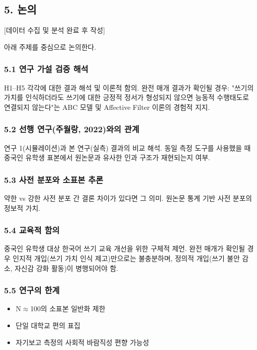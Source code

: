 \documentclass[a4paper,10pt]{oblivoir}
\begin{document}
\subsection{5. 논의}

[데이터 수집 및 분석 완료 후 작성]

아래 주제를 중심으로 논의한다.

\subsubsection{5.1 연구 가설 검증 해석}

H1–H5 각각에 대한 결과 해석 및 이론적 함의. 완전 매개 결과가 확인될 경우: "쓰기의 가치를 인식하더라도 쓰기에 대한 긍정적 정서가 형성되지 않으면 능동적 수행태도로 연결되지 않는다"는 ABC 모델 및 Affective Filter 이론의 경험적 지지.

\subsubsection{5.2 선행 연구(주월랑, 2022)와의 관계}

연구 1(시뮬레이션)과 본 연구(실측) 결과의 비교 해석. 동일 측정 도구를 사용했을 때 중국인 유학생 표본에서 원논문과 유사한 인과 구조가 재현되는지 여부.

\subsubsection{5.3 사전 분포와 소표본 추론}

약한 vs 강한 사전 분포 간 결론 차이가 있다면 그 의미. 원논문 통계 기반 사전 분포의 정보적 가치.

\subsubsection{5.4 교육적 함의}

중국인 유학생 대상 한국어 쓰기 교육 개선을 위한 구체적 제언. 완전 매개가 확인될 경우 인지적 개입(쓰기 가치 인식 제고)만으로는 불충분하며, 정의적 개입(쓰기 불안 감소, 자신감 강화 활동)이 병행되어야 함.

\subsubsection{5.5 연구의 한계}

\begin{itemize}
  \item N\ensuremath{\approx}100의 소표본 일반화 제한
  \item 단일 대학교 편의 표집
  \item 자기보고 측정의 사회적 바람직성 편향 가능성
\end{itemize}
\end{document}
